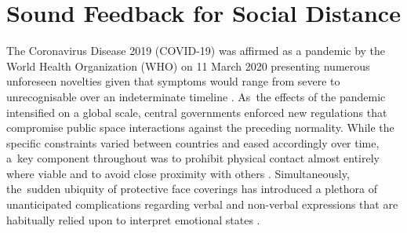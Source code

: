 \section[Sound Feedback for Social Distance]{Sound Feedback for Social Distance}
\label{case_studies:adse_ess_introduction}

The Coronavirus Disease 2019 (COVID-19) was affirmed as a pandemic by the World Health Organization (WHO) on 11 March 2020 \citep{cucinotta_who_2020} presenting numerous unforeseen novelties given that symptoms would range from severe to unrecognisable over an indeterminate timeline \citep{woelfel_clinical_2020}. As~the effects of the pandemic intensified on a global scale, central governments enforced new regulations that compromise public space interactions against the preceding normality. While the specific constraints varied between countries and eased accordingly over time, a~key component throughout was to prohibit physical contact almost entirely where viable and to avoid close proximity with others \citep{toquero_challenges_2020, uk_department_of_health_and_social_care_coronavirus_2020}. Simultaneously, the~sudden ubiquity of protective face coverings has introduced a plethora of unanticipated complications regarding verbal and non-verbal expressions that are habitually relied upon to interpret emotional states \citep{marta_i_2020,carbon_wearing_2020,grundmann_face_2020}.

